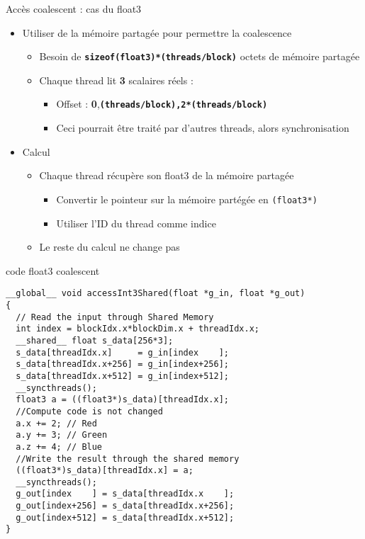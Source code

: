 \documentclass{beamer}
\begin{document}
\begin{frame}{Accès coalescent : cas du float3}

  \begin{itemize}
  \item Utiliser de la mémoire partagée pour permettre la coalescence
    \begin{itemize}
    \item Besoin de \texttt{\bf sizeof(float3)*(threads/block)} octets de mémoire partagée
    \item Chaque thread lit \textbf{3} scalaires réels :
      \begin{itemize}
      \item Offset : \textbf{0},\texttt{\bf (threads/block),2*(threads/block)}
      \item Ceci pourrait être traité par d'autres threads, alors synchronisation
      \end{itemize}
    \end{itemize}
  \item Calcul
    \begin{itemize}
    \item Chaque thread récupère son float3 de la mémoire partagée
      \begin{itemize}
      \item Convertir le pointeur sur la mémoire partégée en \texttt{(float3*)}
      \item Utiliser l'ID du thread comme indice
      \end{itemize}
    \item Le reste du calcul ne change pas
    \end{itemize}
  \end{itemize}
\end{frame}

\begin{frame}[containsverbatim]{code float3 coalescent}

\begin{lstlisting}
__global__ void accessInt3Shared(float *g_in, float *g_out)
{
  // Read the input through Shared Memory
  int index = blockIdx.x*blockDim.x + threadIdx.x;
  __shared__ float s_data[256*3];
  s_data[threadIdx.x]     = g_in[index    ];
  s_data[threadIdx.x+256] = g_in[index+256];
  s_data[threadIdx.x+512] = g_in[index+512];
  __syncthreads();
  float3 a = ((float3*)s_data)[threadIdx.x];
  //Compute code is not changed
  a.x += 2; // Red
  a.y += 3; // Green
  a.z += 4; // Blue
  //Write the result through the shared memory
  ((float3*)s_data)[threadIdx.x] = a;
  __syncthreads();
  g_out[index    ] = s_data[threadIdx.x    ];
  g_out[index+256] = s_data[threadIdx.x+256];
  g_out[index+512] = s_data[threadIdx.x+512];
}
\end{lstlisting}

\end{frame}
\end{document}
